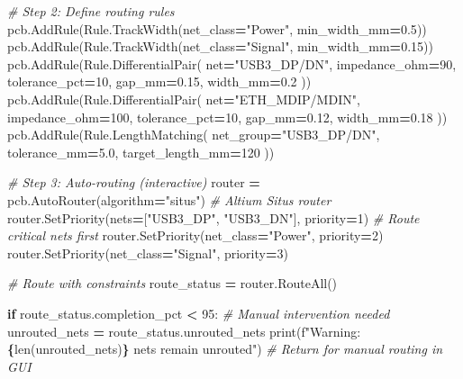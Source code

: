 \documentclass[
]{article}
\newenvironment{Shaded}{\begin{snugshade}}{\end{snugshade}}
\newcommand{\BuiltInTok}[1]{#1}
\newcommand{\CommentTok}[1]{\textcolor[rgb]{0.56,0.35,0.01}{\textit{#1}}}
\newcommand{\ControlFlowTok}[1]{\textcolor[rgb]{0.13,0.29,0.53}{\textbf{#1}}}
\newcommand{\DecValTok}[1]{\textcolor[rgb]{0.00,0.00,0.81}{#1}}
\newcommand{\FloatTok}[1]{\textcolor[rgb]{0.00,0.00,0.81}{#1}}
\newcommand{\NormalTok}[1]{#1}
\newcommand{\OperatorTok}[1]{\textcolor[rgb]{0.81,0.36,0.00}{\textbf{#1}}}
\newcommand{\SpecialCharTok}[1]{\textcolor[rgb]{0.81,0.36,0.00}{\textbf{#1}}}
\newcommand{\SpecialStringTok}[1]{\textcolor[rgb]{0.31,0.60,0.02}{#1}}
\newcommand{\StringTok}[1]{\textcolor[rgb]{0.31,0.60,0.02}{#1}}
\begin{document}
\begin{Shaded}
\begin{Highlighting}[]
    \CommentTok{\# Step 2: Define routing rules}
\NormalTok{    pcb.AddRule(Rule.TrackWidth(net\_class}\OperatorTok{=}\StringTok{"Power"}\NormalTok{, min\_width\_mm}\OperatorTok{=}\FloatTok{0.5}\NormalTok{))}
\NormalTok{    pcb.AddRule(Rule.TrackWidth(net\_class}\OperatorTok{=}\StringTok{"Signal"}\NormalTok{, min\_width\_mm}\OperatorTok{=}\FloatTok{0.15}\NormalTok{))}
\NormalTok{    pcb.AddRule(Rule.DifferentialPair(}
\NormalTok{        net}\OperatorTok{=}\StringTok{"USB3\_DP/DN"}\NormalTok{,}
\NormalTok{        impedance\_ohm}\OperatorTok{=}\DecValTok{90}\NormalTok{,}
\NormalTok{        tolerance\_pct}\OperatorTok{=}\DecValTok{10}\NormalTok{,}
\NormalTok{        gap\_mm}\OperatorTok{=}\FloatTok{0.15}\NormalTok{,}
\NormalTok{        width\_mm}\OperatorTok{=}\FloatTok{0.2}
\NormalTok{    ))}
\NormalTok{    pcb.AddRule(Rule.DifferentialPair(}
\NormalTok{        net}\OperatorTok{=}\StringTok{"ETH\_MDIP/MDIN"}\NormalTok{,}
\NormalTok{        impedance\_ohm}\OperatorTok{=}\DecValTok{100}\NormalTok{,}
\NormalTok{        tolerance\_pct}\OperatorTok{=}\DecValTok{10}\NormalTok{,}
\NormalTok{        gap\_mm}\OperatorTok{=}\FloatTok{0.12}\NormalTok{,}
\NormalTok{        width\_mm}\OperatorTok{=}\FloatTok{0.18}
\NormalTok{    ))}
\NormalTok{    pcb.AddRule(Rule.LengthMatching(}
\NormalTok{        net\_group}\OperatorTok{=}\StringTok{"USB3\_DP/DN"}\NormalTok{,}
\NormalTok{        tolerance\_mm}\OperatorTok{=}\FloatTok{5.0}\NormalTok{,}
\NormalTok{        target\_length\_mm}\OperatorTok{=}\DecValTok{120}
\NormalTok{    ))}

    \CommentTok{\# Step 3: Auto{-}routing (interactive)}
\NormalTok{    router }\OperatorTok{=}\NormalTok{ pcb.AutoRouter(algorithm}\OperatorTok{=}\StringTok{"situs"}\NormalTok{)  }\CommentTok{\# Altium Situs router}
\NormalTok{    router.SetPriority(nets}\OperatorTok{=}\NormalTok{[}\StringTok{"USB3\_DP"}\NormalTok{, }\StringTok{"USB3\_DN"}\NormalTok{], priority}\OperatorTok{=}\DecValTok{1}\NormalTok{)  }\CommentTok{\# Route critical nets first}
\NormalTok{    router.SetPriority(net\_class}\OperatorTok{=}\StringTok{"Power"}\NormalTok{, priority}\OperatorTok{=}\DecValTok{2}\NormalTok{)}
\NormalTok{    router.SetPriority(net\_class}\OperatorTok{=}\StringTok{"Signal"}\NormalTok{, priority}\OperatorTok{=}\DecValTok{3}\NormalTok{)}

    \CommentTok{\# Route with constraints}
\NormalTok{    route\_status }\OperatorTok{=}\NormalTok{ router.RouteAll()}

    \ControlFlowTok{if}\NormalTok{ route\_status.completion\_pct }\OperatorTok{\textless{}} \DecValTok{95}\NormalTok{:}
        \CommentTok{\# Manual intervention needed}
\NormalTok{        unrouted\_nets }\OperatorTok{=}\NormalTok{ route\_status.unrouted\_nets}
        \BuiltInTok{print}\NormalTok{(}\SpecialStringTok{f"Warning: }\SpecialCharTok{\{}\BuiltInTok{len}\NormalTok{(unrouted\_nets)}\SpecialCharTok{\}}\SpecialStringTok{ nets remain unrouted"}\NormalTok{)}
        \CommentTok{\# Return for manual routing in GUI}


\end{Highlighting}
\end{Shaded}
\end{document}
